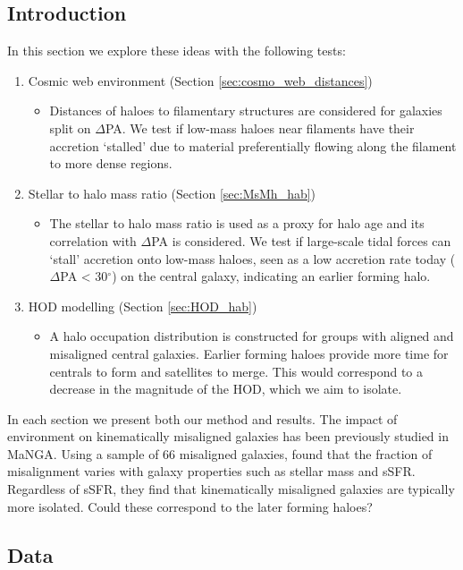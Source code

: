 \subsection{Introduction}
In this section we explore these ideas with the following tests:
\begin{enumerate}
\item Cosmic web environment (Section \ref{sec:cosmo_web_distances})
\begin{itemize}
\item Distances of haloes to filamentary structures are considered for galaxies split on $\Delta$PA. We test if low-mass haloes near filaments have their accretion `stalled' due to material preferentially flowing along the filament to more dense regions. 
\end{itemize}
\item Stellar to halo mass ratio  (Section \ref{sec:MsMh_hab})
\begin{itemize}
\item The stellar to halo mass ratio is used as a proxy for halo age and its correlation with $\Delta$PA is considered. We test if large-scale tidal forces can `stall' accretion onto low-mass haloes, seen as a low accretion rate today ($\Delta$PA < 30$^{\circ}$) on the central galaxy, indicating an earlier forming halo.
\end{itemize}
\item HOD modelling (Section \ref{sec:HOD_hab})
\begin{itemize}
\item A halo occupation distribution is constructed for groups with aligned and misaligned central galaxies. Earlier forming haloes provide more time for centrals to form and satellites to merge. This would correspond to a decrease in the magnitude of the HOD, which we aim to isolate. 
\end{itemize}
\end{enumerate}
In each section we present both our method and results. The impact of environment on kinematically misaligned galaxies has been previously studied in MaNGA. Using a sample of 66 misaligned galaxies, \citet{jin2016} found that the fraction of misalignment varies with galaxy properties such as stellar mass and sSFR. Regardless of sSFR, they find that kinematically misaligned galaxies are typically more isolated. Could these correspond to the later forming haloes?

\subsection{Data}

